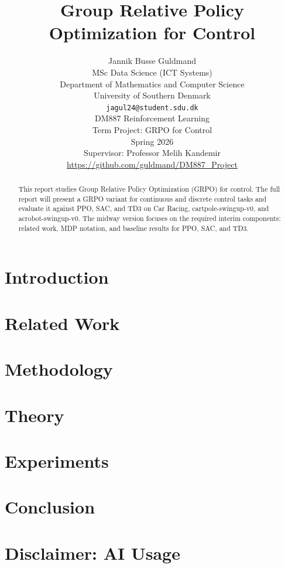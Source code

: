 \documentclass{article}
\title{Group Relative Policy Optimization for Control}
\author{%
  Jannik Busse Guldmand \\
  MSc Data Science (ICT Systems) \\
  Department of Mathematics and Computer Science \\
  University of Southern Denmark \\
  \texttt{jagul24@student.sdu.dk} \\
  \And
  DM887 Reinforcement Learning \\
  Term Project: GRPO for Control \\
  Spring 2026 \\
  Supervisor: Professor Melih Kandemir \\
  \url{https://github.com/guldmand/DM887_Project}
}
\begin{document}
\maketitle
\thispagestyle{plain}

\begin{abstract}
  This report studies Group Relative Policy Optimization (GRPO) for control. The full report will present a GRPO variant for continuous and discrete control tasks and evaluate it against PPO, SAC, and TD3 on Car Racing, cartpole-swingup-v0, and acrobot-swingup-v0. The midway version focuses on the required interim components: related work, MDP notation, and baseline results for PPO, SAC, and TD3.
\end{abstract}

\section{Introduction}
% 


\section{Related Work}


\section{Methodology}
% 


\section{Theory}


\section{Experiments}
% 


\section{Conclusion}


\section*{Disclaimer: AI Usage}

\end{document}

